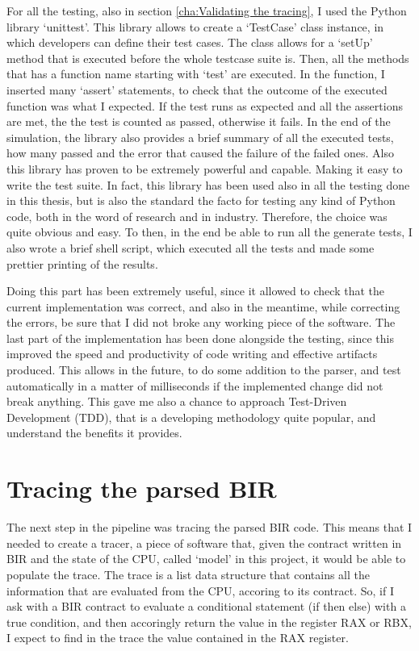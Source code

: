 For all the testing, also in section \ref{cha:Validating the tracing}, I used
the Python library `unittest'. This library allows to create a `TestCase' class instance,
in which developers can define their test cases. The class allows for a `setUp' method
that is executed before the whole testcase suite is. Then, all the methods that has
a function name starting with `test' are executed. In the function, I inserted many
`assert' statements, to check that the outcome of the executed function was what
I expected. If the test runs as expected and all the assertions are met, the the
test is counted as passed, otherwise it fails. In the end of the simulation, the
library also provides a brief summary of all the executed tests, how many passed
and the error that caused the failure of the failed ones. Also this library has proven
to be extremely powerful and capable. Making it easy to write the test suite. In
fact, this library has been used also in all the testing done in this thesis, but
is also the standard the facto for testing any kind of Python code, both in the
word of research and in industry. Therefore, the choice was quite obvious and
easy. To then, in the end be able to run all the generate tests, I also wrote a brief
shell script, which executed all the tests and made some prettier printing of
the results.

Doing this part has been extremely useful, since it allowed to check that the current
implementation was correct, and also in the meantime, while correcting the errors,
be sure that I did not broke any working piece of the software. The last part of
the implementation has been done alongside the testing, since this improved the
speed and productivity of code writing and effective artifacts produced. This allows
in the future, to do some addition to the parser, and test automatically in a matter
of milliseconds if the implemented change did not break anything. This gave me
also a chance to approach Test-Driven Development (TDD), that is a developing methodology
quite popular, and understand the benefits it provides.

\section{Tracing the parsed BIR}
\label{cha:Tracing the parsed BIR} The next step in the pipeline was tracing the
parsed BIR code. This means that I needed to create a tracer, a piece of
software that, given the contract written in BIR and the state of the CPU,
called `model' in this project, it would be able to populate the trace. The
trace is a list data structure that contains all the information that are
evaluated from the CPU, accoring to its contract. So, if I ask with a BIR contract
to evaluate a conditional statement (if then else) with a true condition, and
then accoringly return the value in the register RAX or RBX, I expect to find in
the trace the value contained in the RAX register.

